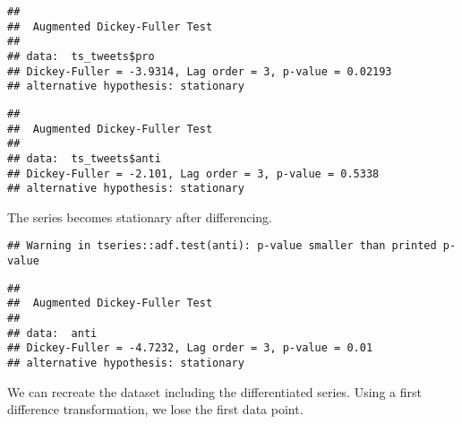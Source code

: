 \documentclass[
]{article}
\newenvironment{Shaded}{\begin{snugshade}}{\end{snugshade}}
\newcommand{\DecValTok}[1]{\textcolor[rgb]{0.00,0.00,0.81}{#1}}
\newcommand{\FunctionTok}[1]{\textcolor[rgb]{0.13,0.29,0.53}{\textbf{#1}}}
\newcommand{\NormalTok}[1]{#1}
\newcommand{\OtherTok}[1]{\textcolor[rgb]{0.56,0.35,0.01}{#1}}
\newcommand{\SpecialCharTok}[1]{\textcolor[rgb]{0.81,0.36,0.00}{\textbf{#1}}}
\begin{document}
\begin{Shaded}
\end{Shaded}

\begin{verbatim}
## 
##  Augmented Dickey-Fuller Test
## 
## data:  ts_tweets$pro
## Dickey-Fuller = -3.9314, Lag order = 3, p-value = 0.02193
## alternative hypothesis: stationary
\end{verbatim}

\begin{Shaded}
\end{Shaded}

\begin{verbatim}
## 
##  Augmented Dickey-Fuller Test
## 
## data:  ts_tweets$anti
## Dickey-Fuller = -2.101, Lag order = 3, p-value = 0.5338
## alternative hypothesis: stationary
\end{verbatim}

The series becomes stationary after differencing.

\begin{Shaded}
\end{Shaded}

\begin{verbatim}
## Warning in tseries::adf.test(anti): p-value smaller than printed p-value
\end{verbatim}

\begin{verbatim}
## 
##  Augmented Dickey-Fuller Test
## 
## data:  anti
## Dickey-Fuller = -4.7232, Lag order = 3, p-value = 0.01
## alternative hypothesis: stationary
\end{verbatim}

We can recreate the dataset including the differentiated series. Using a first difference transformation, we lose the first data point.
\end{document}
